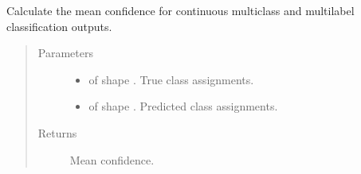 \documentclass[letterpaper,10pt,english]{sphinxmanual}
\begin{document}
\begin{fulllineitems}
\label{\detokenize{pusion.evaluation.evaluation_metrics:pusion.evaluation.evaluation_metrics.mean_confidence}}
\sphinxAtStartPar
Calculate the mean confidence for continuous multiclass and multilabel classification outputs.
\begin{quote}\begin{description}
\item[{Parameters}] \leavevmode\begin{itemize}
\item {} 
\sphinxAtStartPar
{} \textendash{}  of shape . True class assignments.

\item {} 
\sphinxAtStartPar
{} \textendash{}  of shape . Predicted class assignments.

\end{itemize}

\item[{Returns}] \leavevmode
\sphinxAtStartPar
Mean confidence.

\end{description}\end{quote}

\end{fulllineitems}

\end{document}
